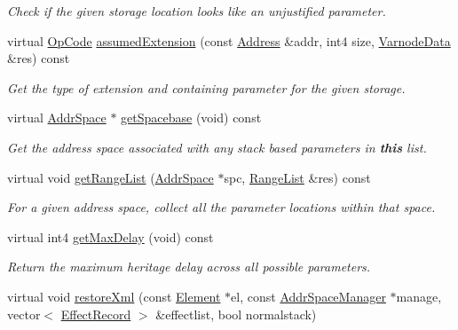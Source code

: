 \begin{DoxyCompactItemize}
\begin{DoxyCompactList}\small\item\em Check if the given storage location looks like an {\itshape unjustified} parameter. \end{DoxyCompactList}\item 
virtual \mbox{\hyperlink{opcodes_8hh_abeb7dfb0e9e2b3114e240a405d046ea7}{Op\+Code}} \mbox{\hyperlink{class_param_list_standard_aa9fb818f8190ec57216242d3d20786e8}{assumed\+Extension}} (const \mbox{\hyperlink{class_address}{Address}} \&addr, int4 size, \mbox{\hyperlink{struct_varnode_data}{Varnode\+Data}} \&res) const
\begin{DoxyCompactList}\small\item\em Get the type of extension and containing parameter for the given storage. \end{DoxyCompactList}\item 
virtual \mbox{\hyperlink{class_addr_space}{Addr\+Space}} $\ast$ \mbox{\hyperlink{class_param_list_standard_a8c6910cf8fb253c2f64361dbf92901c5}{get\+Spacebase}} (void) const
\begin{DoxyCompactList}\small\item\em Get the address space associated with any stack based parameters in {\bfseries{this}} list. \end{DoxyCompactList}\item 
virtual void \mbox{\hyperlink{class_param_list_standard_a715b7fc4875a69e7e5b8b498002f03de}{get\+Range\+List}} (\mbox{\hyperlink{class_addr_space}{Addr\+Space}} $\ast$spc, \mbox{\hyperlink{class_range_list}{Range\+List}} \&res) const
\begin{DoxyCompactList}\small\item\em For a given address space, collect all the parameter locations within that space. \end{DoxyCompactList}\item 
virtual int4 \mbox{\hyperlink{class_param_list_standard_aeb0fe74f815ad09f021ace22eb60d06a}{get\+Max\+Delay}} (void) const
\begin{DoxyCompactList}\small\item\em Return the maximum heritage delay across all possible parameters. \end{DoxyCompactList}\item 
virtual void \mbox{\hyperlink{class_param_list_standard_a7dc8219ff6422f4e23d12643b68eb100}{restore\+Xml}} (const \mbox{\hyperlink{class_element}{Element}} $\ast$el, const \mbox{\hyperlink{class_addr_space_manager}{Addr\+Space\+Manager}} $\ast$manage, vector$<$ \mbox{\hyperlink{class_effect_record}{Effect\+Record}} $>$ \&effectlist, bool normalstack)

\end{DoxyCompactItemize}
